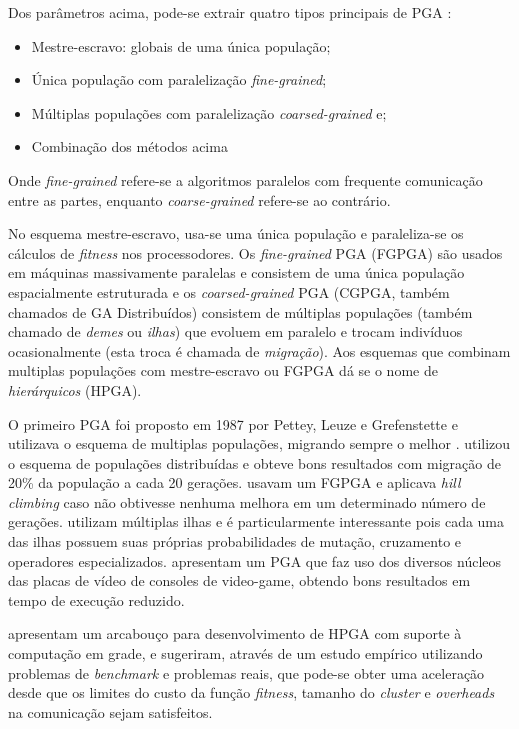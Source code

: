 \documentclass[12pt]{article}
\begin{document}
Dos parâmetros acima, pode-se extrair quatro tipos principais de PGA \cite{cantu1998}: 
\begin{itemize}
  \item Mestre-escravo: globais de uma única população;
  \item Única população com paralelização \emph{fine-grained};
  \item Múltiplas populações com paralelização \emph{coarsed-grained} e;
  \item Combinação dos métodos acima
\end{itemize}
Onde \emph{fine-grained} refere-se a algoritmos paralelos com frequente comunicação entre as partes, enquanto \emph{coarse-grained} refere-se ao contrário.

No esquema mestre-escravo, usa-se uma única população e paraleliza-se os cálculos de \emph{fitness} nos processodores. Os \emph{fine-grained} PGA (FGPGA) são usados em máquinas massivamente paralelas e consistem de uma única população espacialmente estruturada e os \emph{coarsed-grained} PGA (CGPGA, também chamados de GA Distribuídos) consistem de múltiplas populações (também chamado de \emph{demes} ou \emph{ilhas}) que evoluem em paralelo e trocam indivíduos ocasionalmente (esta troca é chamada de \emph{migração}). Aos esquemas que combinam multiplas populações com mestre-escravo ou FGPGA dá se o nome de \emph{hierárquicos} (HPGA).

O primeiro PGA foi proposto em 1987 por Pettey, Leuze e Grefenstette e utilizava o esquema de multiplas populações, migrando sempre o melhor \cite{albasurvey}. \cite{tanese1989} utilizou o esquema de populações distribuídas e obteve bons resultados com migração de 20\% da população a cada 20 gerações. \cite{asparagos1989} usavam um FGPGA e aplicava \emph{hill climbing} caso não obtivesse nenhuma melhora em um determinado número de gerações. \cite{adamidis1996} utilizam múltiplas ilhas e é particularmente interessante pois cada uma das ilhas possuem suas próprias probabilidades de mutação, cruzamento e operadores especializados. \cite{wilson2010} apresentam um PGA que faz uso dos diversos núcleos das placas de vídeo de consoles de video-game, obtendo bons resultados em tempo de execução reduzido.

\cite{lim2007} apresentam um arcabouço para desenvolvimento de HPGA com suporte à computação em grade, e sugeriram, através de um estudo empírico utilizando problemas de \emph{benchmark} e problemas reais, que pode-se obter uma aceleração desde que os limites do custo da função \emph{fitness}, tamanho do \emph{cluster} e \emph{overheads} na comunicação sejam satisfeitos.
\end{document}
